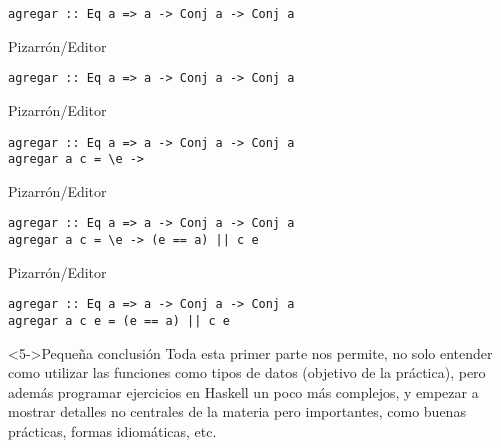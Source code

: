 \documentclass[pdf]{beamer}
\begin{document}
\begin{frame}[fragile]{\texttt{agregar :: Eq a => a -> Conj a -> Conj a}}

\begin{overprint}
    
\begin{block}{Pizarrón/Editor}
\begin{verbatim}
agregar :: Eq a => a -> Conj a -> Conj a

\end{verbatim}
\end{block}

\begin{block}{Pizarrón/Editor}
\begin{verbatim}
agregar :: Eq a => a -> Conj a -> Conj a
agregar a c = \e -> 
\end{verbatim}
\end{block}

\begin{block}{Pizarrón/Editor}
\begin{verbatim}
agregar :: Eq a => a -> Conj a -> Conj a
agregar a c = \e -> (e == a) || c e
\end{verbatim}
\end{block}

\begin{block}{Pizarrón/Editor}
\begin{verbatim}
agregar :: Eq a => a -> Conj a -> Conj a
agregar a c e = (e == a) || c e
\end{verbatim}
\end{block}

\end{overprint}


\begin{block}<5->{Pequeña conclusión}
Toda esta primer parte nos permite, no solo entender como utilizar las funciones como tipos de datos (objetivo de la práctica),
pero además programar ejercicios en Haskell un poco más complejos, y empezar a mostrar detalles no centrales de la materia pero importantes, como buenas prácticas, formas idiomáticas, etc.
\end{block}

\end{frame}
\end{document}

